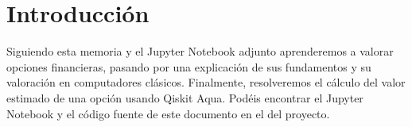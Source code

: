 \section{Introducción}

Siguiendo esta memoria y el Jupyter Notebook adjunto aprenderemos a valorar opciones financieras, pasando por una explicación de sus fundamentos y su valoración en computadores clásicos. Finalmente, resolveremos el cálculo del valor estimado de una opción usando Qiskit \cite{Qiskit} Aqua. Podéis encontrar el Jupyter Notebook y el código fuente de este documento en el \projectloc del proyecto.
